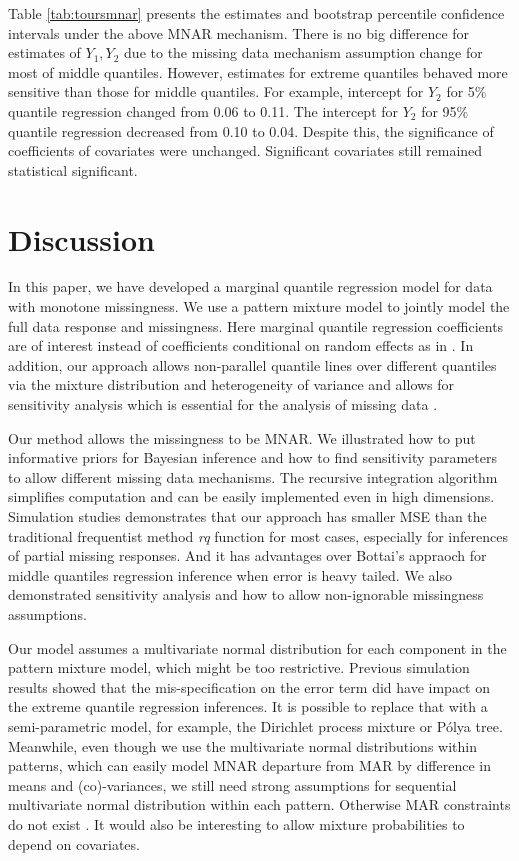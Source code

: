 \documentclass[12pt]{article}
\newcommand{\polya}{P\'{o}lya}
\begin{document}
Table \ref{tab:toursmnar} presents the estimates and bootstrap
percentile confidence intervals under the above MNAR mechanism. There
is no big difference for estimates of $Y_1, Y_2$ due to the missing
data mechanism assumption change for most of middle
quantiles. However, estimates for extreme quantiles behaved more
sensitive than those for middle quantiles.  For example, intercept for
$Y_2$ for 5\% quantile regression changed from 0.06 to 0.11.  The
intercept for $Y_2$ for 95\% quantile regression decreased from 0.10
to 0.04.  Despite this, the significance of coefficients of covariates
were unchanged. Significant covariates still remained statistical
significant.

\section{Discussion}
\label{sec:discussion}

In this paper, we have developed a marginal quantile regression model
for data with monotone missingness. We use a pattern mixture model to
jointly model the full data response and missingness. Here marginal
quantile regression coefficients are of interest instead of
coefficients conditional on random effects as in \citet{yuan2010}. In
addition, our approach allows non-parallel quantile lines over
different quantiles via the mixture distribution and heterogeneity of
variance and allows for sensitivity analysis which is essential for
the analysis of missing data \citep{nas2010}.

Our method allows the missingness to be MNAR.  We illustrated how to
put informative priors for Bayesian inference and how to find
sensitivity parameters to allow different missing data mechanisms.
The recursive integration algorithm simplifies computation and can be
easily implemented even in high dimensions.  Simulation studies
demonstrates that our approach has smaller MSE than the traditional
frequentist method \textit{rq} function for most cases, especially for
inferences of partial missing responses. And it has advantages over
Bottai's appraoch for middle quantiles regression inference when error
is heavy tailed. We also demonstrated sensitivity analysis and how to
allow non-ignorable missingness assumptions.

Our model assumes a multivariate normal distribution for each
component in the pattern mixture model, which might be too
restrictive. Previous simulation results showed that the
mis-specification on the error term did have impact on the extreme
quantile regression inferences.  It is possible to replace that with a
semi-parametric model, for example, the Dirichlet process mixture or
\polya{} tree.  Meanwhile, even though we use the multivariate normal
distributions within patterns, which can easily model MNAR departure
from MAR by difference in means and (co)-variances, we still need
strong assumptions for sequential multivariate normal distribution
within each pattern. Otherwise MAR constraints do not exist
\citep{wang2011}.  It would also be interesting to allow mixture
probabilities to depend on covariates.
\end{document}
